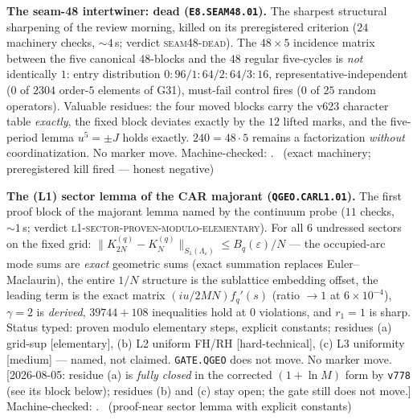 \documentclass[11pt,a4paper]{article}
\theoremstyle{definition}
\begin{document}
\par\smallskip\noindent\textbf{The seam-48 intertwiner: dead
(\texttt{E8.SEAM48.01}).}
The sharpest structural sharpening of the review morning, killed on
its preregistered criterion ($24$ machinery checks, ${\sim}4$\,s;
verdict \textsc{seam48-dead}).  The $48\times5$ incidence matrix
between the five canonical $48$-blocks and the $48$ regular
five-cycles is \emph{not} identically $1$: entry distribution
$0{:}96/1{:}64/2{:}64/3{:}16$, representative-independent ($0$ of
$2304$ order-$5$ elements of G31), must-fail control fires ($0$ of
$25$ random operators).  Valuable residues: the four moved blocks
carry the v623 character table \emph{exactly}, the fixed block
deviates exactly by the $12$ lifted marks, and the five-period
lemma $u^5=\pm J$ holds exactly.  $240=48\cdot5$ remains a
factorization \emph{without} coordinatization.  No marker move.
Machine-checked: .
\mE\ (exact machinery; preregistered kill fired --- honest
negative)
\par\smallskip

\par\smallskip\noindent\textbf{The (L1) sector lemma of the CAR
majorant (\texttt{QGEO.CARL1.01}).}
The first proof block of the majorant lemma named by the continuum
probe ($11$ checks, ${\sim}1$\,s; verdict
\textsc{l1-sector-proven-modulo-elementary}).  For all $6$
undressed sectors on the fixed grid:
$\|K_{2N}^{(q)}-K_N^{(q)}\|_{S_1(\Lambda_\varepsilon)}\le
B_q(\varepsilon)/N$ --- the occupied-arc mode sums are \emph{exact}
geometric sums (exact summation replaces Euler--Maclaurin), the
entire $1/N$ structure is the sublattice embedding offset, the
leading term is the exact matrix $(iu/2MN)f_q'(s)$ (ratio $\to1$ at
$6\times10^{-4}$), $\gamma=2$ is \emph{derived}, $39744{+}108$
inequalities hold at $0$ violations, and $r_1=1$ is sharp.  Status
typed: proven modulo elementary steps, explicit constants; residues
(a) grid-sup [elementary], (b) L2 uniform FH/RH [hard-technical],
(c) L3 uniformity [medium] --- named, not claimed.
\texttt{GATE.QGEO} does not move.  No marker move.
[2026-08-05: residue (a) is \emph{fully closed} in the corrected
$(1+\ln M)$ form by \texttt{v778} (see its block below); residues
(b) and (c) stay open; the gate still does not move.]
Machine-checked: .
\mE\ (proof-near sector lemma with explicit constants)
\par\smallskip
\end{document}
